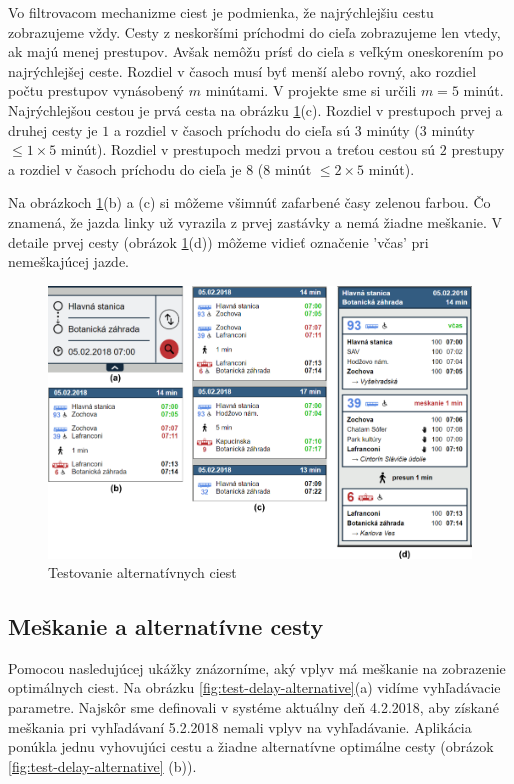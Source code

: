 Vo filtrovacom mechanizme ciest je podmienka, že najrýchlejšiu cestu zobrazujeme vždy. Cesty z neskoršími príchodmi do cieľa zobrazujeme len vtedy, ak majú menej prestupov. Avšak nemôžu prísť do cieľa s veľkým oneskorením po najrýchlejšej ceste. Rozdiel v časoch musí byť menší alebo rovný, ako rozdiel počtu prestupov vynásobený $m$ minútami. V projekte sme si určili $m = 5$ minút. Najrýchlejšou cestou je prvá cesta na obrázku \ref{fig:test-alternative}(c). Rozdiel v prestupoch prvej a druhej cesty je $1$ a rozdiel v časoch príchodu do cieľa sú $3$ minúty ($3$ minúty $\leq 1\times5$ minút).
Rozdiel v prestupoch medzi prvou a treťou cestou sú $2$ prestupy a rozdiel v časoch príchodu do cieľa je $8$ ($8$ minút $\leq 2\times5$ minút).

Na obrázkoch \ref{fig:test-alternative}(b) a (c) si môžeme všimnúť zafarbené časy zelenou farbou. Čo znamená, že jazda linky už vyrazila z prvej zastávky a nemá žiadne meškanie. V detaile prvej cesty (obrázok \ref{fig:test-alternative}(d)) môžeme vidieť označenie 'včas' pri nemeškajúcej jazde.

\begin{figure}[H]
\centerline{\includegraphics[width=1.0\textwidth]{images/test/alternative}}
\caption[Testovanie alternatívnych ciest]{Testovanie alternatívnych ciest}
\label{fig:test-alternative}
\end{figure}

\subsection{Meškanie a alternatívne cesty}
Pomocou nasledujúcej ukážky znázorníme, aký vplyv má meškanie na zobrazenie optimálnych ciest. Na obrázku \ref{fig:test-delay-alternative}(a) vidíme vyhľadávacie parametre. Najskôr sme definovali v systéme aktuálny deň 4.2.2018, aby získané meškania pri vyhľadávaní 5.2.2018 nemali vplyv na vyhľadávanie. Aplikácia ponúkla jednu vyhovujúci cestu a žiadne alternatívne optimálne cesty (obrázok \ref{fig:test-delay-alternative} (b)). 


